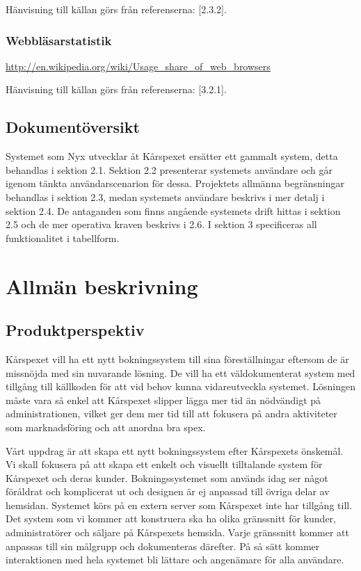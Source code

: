 \documentclass[a4paper, twoside, 11pt, titlepage]{article}
\begin{document}
		Hänvisning till källan görs från referenserna: [2.3.2].

		\subsubsection{Webbläsarstatistik}


		\url{http://en.wikipedia.org/wiki/Usage_share_of_web_browsers}

		Hänvisning till källan görs från referenserna: [3.2.1].

	\subsection{Dokumentöversikt}


	Systemet som Nyx utvecklar åt Kårspexet ersätter ett gammalt system, detta behandlas i sektion 2.1. Sektion 2.2 presenterar systemets användare och går igenom tänkta användarscenarion för dessa. Projektets allmänna begränsningar behandlas i sektion 2.3, medan systemets användare beskrivs i mer detalj i sektion 2.4. De antaganden som finns angående systemets drift hittas i sektion 2.5 och de mer operativa kraven beskrivs i 2.6. I sektion 3 specificeras all funktionalitet i tabellform.

\clearpage
\section{Allmän beskrivning}



	\subsection{Produktperspektiv}


	Kårspexet vill ha ett nytt bokningssystem till sina föreställningar eftersom de är missnöjda med sin nuvarande lösning. De vill ha ett väldokumenterat system med tillgång till källkoden för att vid behov kunna vidareutveckla systemet. Lösningen måste vara så enkel att Kårspexet slipper lägga mer tid än nödvändigt på administrationen, vilket ger dem mer tid till att fokusera på andra aktiviteter som marknadsföring och att anordna bra spex.

	Vårt uppdrag är att skapa ett nytt bokningssystem efter Kårspexets önskemål. Vi skall fokusera på att skapa ett enkelt och visuellt tilltalande system för Kårspexet och deras kunder. Bokningssystemet som används idag ser något föråldrat och komplicerat ut och designen är ej anpassad till övriga delar av hemsidan. Systemet körs på en extern server som Kårspexet inte har tillgång till. Det system som vi kommer att konstruera ska ha olika gränssnitt för kunder, administratörer och säljare på Kårspexets hemsida. Varje gränssnitt kommer att anpassas till sin målgrupp och dokumenteras därefter. På så sätt kommer interaktionen med hela systemet bli lättare och angenämare för alla användare.
\end{document}
